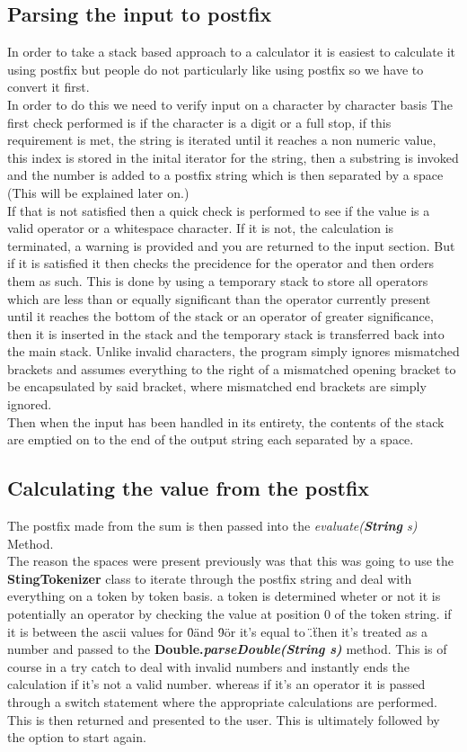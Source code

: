 \documentclass{article}
\begin{document}
	\subsection{Parsing the input to postfix}
	In order to take a stack based approach to a calculator it is easiest to calculate it using postfix but people do not particularly like using postfix so we have to convert it first.\\
	In order to do this we need to verify input on a character by character basis
	The first check performed is if the character is a digit or a full stop, if this requirement is met, the string is iterated until it reaches a non numeric value, this index is stored in the inital iterator for the string, then a substring is invoked and the number is added to a postfix string which is then separated by a space (This will be explained later on.)\\
	If that is not satisfied then a quick check is performed to see if the value is a valid operator or a whitespace character. If it is not, the calculation is terminated, a warning is provided and you are returned to the input section. But if it is satisfied it then checks the precidence for the operator and then orders them as such. This is done by using a temporary stack to store all operators which are less than or equally significant than the operator currently present until it reaches the bottom of the stack or an operator of greater significance, then it is inserted in the stack and the temporary stack is transferred back into the main stack. Unlike invalid characters, the program simply ignores mismatched brackets and assumes everything to the right of a mismatched opening bracket to be encapsulated by said bracket, where mismatched end brackets are simply ignored.\\
	Then when the input has been handled in its entirety, the contents of the stack are emptied on to the end of the output string each separated by a space.

	\subsection{Calculating the value from the postfix}
	The postfix made from the sum is then passed into the \textit{evaluate(\textbf{String} s)} Method.\\
	The reason the spaces were present previously was that this was going to use the \textbf{StingTokenizer} class to iterate through the postfix string and deal with everything on a token by token basis. a token is determined wheter or not it is potentially an operator by checking the value at position 0 of the token string. if it is between the ascii values for \"0\" and \"9\" or it's equal to \".\" then it's treated as a number and passed to the \textbf{Double.\textit{parseDouble(String s)}} method. This is of course in a try catch to deal with invalid numbers and instantly ends the calculation if it's not a valid number. whereas if it's an operator it is passed through a switch statement where the appropriate calculations are performed. This is then returned and presented to the user. This is ultimately followed by the option to start again.
\end{document}
